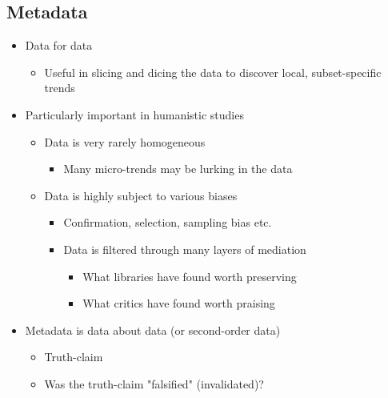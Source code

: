 \documentclass[a4paper]{article}
\begin{document}
\subsection{Metadata}
\begin{itemize}
    \item Data for data
    \begin{itemize}[label=$\circ$]
        \item Useful in slicing and dicing the data to discover local, subset-specific trends
    \end{itemize}
    \item Particularly important in humanistic studies
    \begin{itemize}[label=$\circ$]
        \item Data is very rarely homogeneous
        \begin{itemize}[label=\tiny$\blacksquare$]
            \item Many micro-trends may be lurking in the data
        \end{itemize}
        \item Data is highly subject to various biases
        \begin{itemize}[label=\tiny$\blacksquare$]
            \item Confirmation, selection, sampling bias etc.
            \item Data is filtered through many layers of mediation
            \begin{itemize}[label=--]
                \item What libraries have found worth preserving
                \item What critics have found worth praising
            \end{itemize}
        \end{itemize}
    \end{itemize}
    \item Metadata is data about data (or second-order data)
    \begin{itemize}[label=$\circ$]
        \item Truth-claim
        \item Was the truth-claim "falsified" (invalidated)?
    \end{itemize}
\end{itemize}
\end{document}
